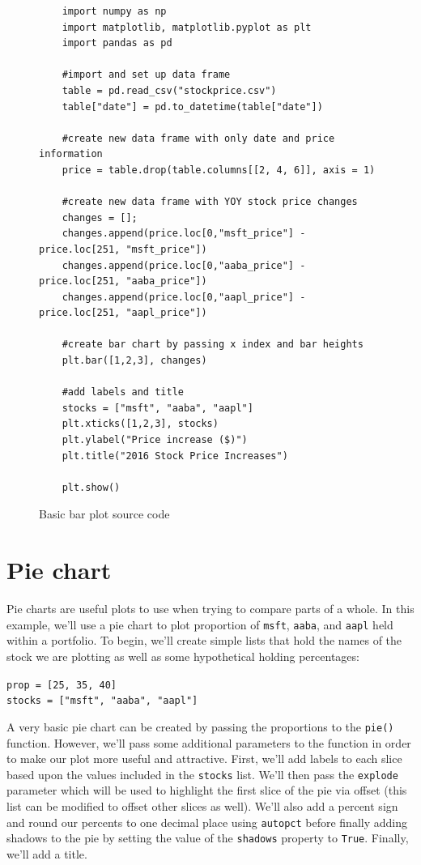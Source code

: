 \documentclass{book}
\begin{document}
\begin{figure}[h]
	\caption{Basic bar plot source code}
	\begin{lstlisting}
	import numpy as np
	import matplotlib, matplotlib.pyplot as plt
	import pandas as pd
	
	#import and set up data frame
	table = pd.read_csv("stockprice.csv")
	table["date"] = pd.to_datetime(table["date"])
	
	#create new data frame with only date and price information
	price = table.drop(table.columns[[2, 4, 6]], axis = 1)
	
	#create new data frame with YOY stock price changes
	changes = [];
	changes.append(price.loc[0,"msft_price"] - price.loc[251, "msft_price"])
	changes.append(price.loc[0,"aaba_price"] - price.loc[251, "aaba_price"])
	changes.append(price.loc[0,"aapl_price"] - price.loc[251, "aapl_price"])
	
	#create bar chart by passing x index and bar heights
	plt.bar([1,2,3], changes)
	
	#add labels and title
	stocks = ["msft", "aaba", "aapl"]
	plt.xticks([1,2,3], stocks)
	plt.ylabel("Price increase ($)")
	plt.title("2016 Stock Price Increases")
	
	plt.show()
	\end{lstlisting}
\end{figure}

\section{Pie chart}

Pie charts are useful plots to use when trying to compare parts of a whole. In this example, we'll use a pie chart to plot proportion of \texttt{msft}, \texttt{aaba}, and \texttt{aapl} held within a portfolio. To begin, we'll create simple lists that hold the names of the stock we are plotting as well as some hypothetical holding percentages:

\texttt{prop = [25, 35, 40]\\stocks = ["msft", "aaba", "aapl"]}

A very basic pie chart can be created by passing the proportions to the \texttt{pie()} function. However, we'll pass some additional parameters to the function in order to make our plot more useful and attractive. First, we'll add labels to each slice based upon the values included in the \texttt{stocks} list. We'll then pass the \texttt{explode} parameter which will be used to highlight the first slice of the pie via offset (this list can be modified to offset other slices as well). We'll also add a percent sign and round our percents to one decimal place using \texttt{autopct} before finally adding shadows to the pie by setting the value of the \texttt{shadows} property to \texttt{True}. Finally, we'll add a title.
\end{document}
